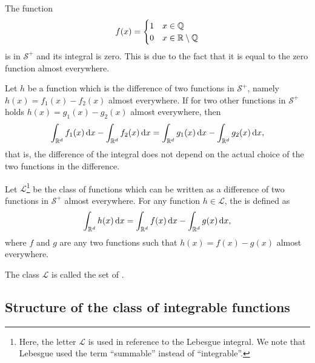 \begin{example}
  The function
  \begin{gather*}
    f(x) =
    \begin{cases}
      1 & x\in \mathbb Q \\
      0 & x\in \mathbb R\setminus \mathbb Q
    \end{cases}
  \end{gather*}
  is in $\mathcal S^+$ and its integral is zero. This is due to the fact that
  it is equal to the zero function almost everywhere.
\end{example}

\begin{lemma}
  Let $h$ be a function which is the difference of two functions in
  $\mathcal S^+$, namely $h(x) = f_1(x)-f_2(x)$ almost everywhere. If
  for two other functions in $\mathcal S^+$ holds $h(x) =
  g_1(x)-g_2(x)$ almost everywhere, then
  \begin{gather}
    \label{eq:integral:2}
    \int_{\mathbb R^d} f_1(x)\,\mathrm{d} x
    -\int_{\mathbb R^d} f_2(x)\,\mathrm{d} x
    =\int_{\mathbb R^d} g_1(x)\,\mathrm{d} x
    -\int_{\mathbb R^d} g_2(x)\,\mathrm{d} x,
  \end{gather}
  that is, the difference of the integral does not depend on the
  actual choice of the two functions in the difference.
\end{lemma}

\begin{definition}
  Let $\mathcal L$\footnote{Here, the letter $\mathcal L$ is used in
    reference to the Lebesgue integral. We note that Lebesgue used the
    term ``summable'' instead of ``integrable''.} be the class of
  functions which can be written as a difference of two functions in
  $\mathcal S^+$ almost everywhere. For any function $h\in \mathcal
  L$, the  is defined as
  \begin{gather*}
    \int_{\mathbb R^d} h(x)\,\mathrm{d} x = \int_{\mathbb R^d} f(x)\,\mathrm{d} x - \int_{\mathbb R^d} g(x)\,\mathrm{d} x,
  \end{gather*}
  where $f$ and $g$ are any two functions such that $h(x) = f(x) -
  g(x)$ almost everywhere.
  
  The class $\mathcal L$ is called the set of .
\end{definition}

\subsection{Structure of the class of integrable functions}

